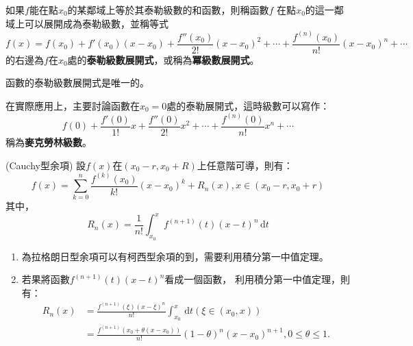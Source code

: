 \documentclass[a4paper,12pt]{article}
\theoremstyle{theorem}
\begin{document}
\begin{CJK*}{UTF8}{bsmi}
    如果$f$能在點$x_0$的某鄰域上等於其泰勒級數的和函數，則稱函數$f$
    在點$x_0$的這一鄰域上可以展開成為泰勒級數，並稱等式
    \begin{equation}
        f(x) = f(x_0) + f'(x_0)(x - x_0) + \frac{f''(x_0)}{2!}(x - x_0)^2 
               + \cdots + \frac{f^{(n)}(x_0)}{n!}(x - x_0)^n + \cdots
               \label{eq:eq11}
    \end{equation}
    的右邊為$f$在$x_0$處的\textbf{泰勒級數展開式}，或稱為\textbf{冪級數展開式}。

    \begin{remark}
        函數的泰勒級數展開式是唯一的。
    \end{remark}

    在實際應用上，主要討論函數在$x_0 = 0$處的泰勒展開式，這時級數可以寫作：
    \[
        f(0) + \frac{f'(0)}{1!}x + \frac{f''(0)}{2!}x^2 + \cdots 
             + \frac{f^{(n)}(0)}{n!}x^n + \cdots 
    \]
    稱為\textbf{麥克勞林級數}。

    \begin{theorem}{\rm (Cauchy型余項)}
        設$f(x)$在$(x_0-r, x_0+R)$上任意階可導，則有：
        \[
            f(x) = \sum_{k=0}^{n} \frac{f^{(k)}(x_0)}{k!}(x - x_0)^k 
                   + R_n(x), x \in (x_0-r, x_0+r)
        \]
        其中，
        \begin{equation}
            R_n(x) = \frac{1}{n!}\int_{x_0}^{x} f^{(n+1)}(t)(x - t)^n\,
                     \mathrm{d}t
        \end{equation}
    \end{theorem}
    
    \begin{remark}
        \begin{enumerate}[label={\rm(\arabic*)}]
            \item 為拉格朗日型余項可以有柯西型余項的到，需要利用積分第一中值定理。
            \item 若果將函數$\displaystyle f^{(n+1)}(t)(x - t)^n$看成一個函數，
                利用積分第一中值定理，則有：
                \begin{equation}
                    \begin{split}
                        R_n(x) & = \frac{f^{(n+1)}(\xi)(x - \xi)^n}{n!} 
                    \int_{x_0}^{x}\, \mathrm{d}t (\xi \in (x_0, x)) \\
                        & = \frac{f^{(n+1)}(x_0 + \theta(x - x_0))}{n!} 
                            (1 - \theta)^n(x - x_0)^{n+1}, 0 \le \theta \le 1.
                    \end{split}
                \end{equation}
        \end{enumerate}
    \end{remark}


\end{CJK*}
\end{document}
